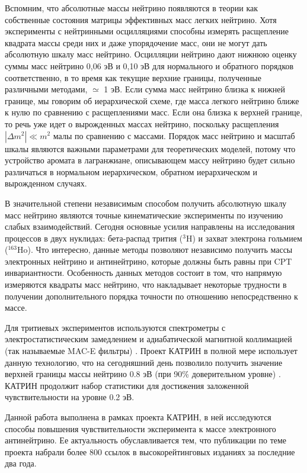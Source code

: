 \documentclass[a4paper,14pt]{extarticle}
\begin{document}
    Вспомним, что абсолютные массы нейтрино появляются в теории как собственные состояния матрицы 
    эффективных масс легких нейтрино. Хотя эксперименты с нейтринными осцилляциями способны измерять 
    расщепление квадрата массы среди них и даже упорядочение масс, они не могут дать абсолютную 
    шкалу масс нейтрино. Осцилляции нейтрино дают нижнюю оценку суммы масс нейтрино 0,06 эВ и 0,10 эВ 
    для нормального и обратного порядков соответственно, в то время как текущие верхние границы, полученные 
    различными методами, $\simeq$ 1 эВ. Если сумма масс нейтрино близка к нижней границе, мы говорим 
    об иерархической схеме, где масса легкого нейтрино ближе к нулю по сравнению с расщеплениями масс. 
    Если она близка к верхней границе, то речь уже идет о вырожденных массах нейтрино, поскольку расщепления 
    $|\Delta m^2| \ll m^2 $ малы по сравнению с массами. Порядок масс нейтрино и масштаб шкалы являются
    важными параметрами для теоретических моделей, потому что устройство аромата в лагранжиане, описывающем 
    массу нейтрино будет сильно различаться в нормальном иерархическом, обратном иерархическом и вырожденном случаях. 
    
    В значительной степени независимым способом получить абсолютную шкалу масс нейтрино 
    являются точные кинематические эксперименты по изучению слабых взаимодействий. Сегодня 
    основные усилия направлены на исследования процессов в двух нуклидах: бета-распад трития ($^{3}$H) и 
    захват электрона гольмием ($^{163}$Ho). Что интересно, данные методы позволяют независимо 
    получить массы электронных нейтрино и антинейтрино, которые должны быть равны при CPT 
    инвариантности. Особенность данных методов состоит в том, что напрямую измеряются квадраты
    масс нейтрино, что накладывает некоторые трудности в получении дополнительного порядка
    точности по отношению непосредственно к массе. 
    
    Для тритиевых экспериментов используются спектрометры с электростатистическим замедлением
    и адиабатической магнитной коллимацией (так называемые MAC-E фильтры) \cite{lobashev} \cite{picard}.
    Проект КАТРИН в полной мере использует данную технологию, что на сегодняшний день позволило
    получить значение верхней границы массы нейтрино 0.8 эВ (при 90\% доверительном уровне) \cite{aker}.
    КАТРИН продолжит набор статистики для достижения заложенной чувствительности на уровне
    0.2 эВ.
    
    
    
    Данной работа выполнена в рамках проекта КАТРИН, в ней исследуются способы повышения 
    чувствительности эксперимента к массе электронного антинейтрино. Ее актуальность 
    обуславливается тем, что публикации по теме проекта набрали более 800 ссылок
    в высокорейтинговых изданиях за последние два года.
    
\end{document}
